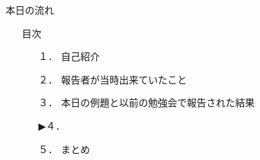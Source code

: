 \begin{frame}{本日の流れ}
  \begin{itemize}
      \item[] 目次
      \begin{itemize}[itemsep=1.3ex, leftmargin=1cm]
        \item[１．] {\color{cud_lightgray} 自己紹介}
        \item[２．] {\color{cud_lightgray} 報告者が当時出来ていたこと}
        \item[３．] {\color{cud_lightgray} 本日の例題と以前の勉強会で報告された結果}
        \item[▶４．] 
        \item[５．] まとめ
      \end{itemize}
  \end{itemize}
\end{frame}
